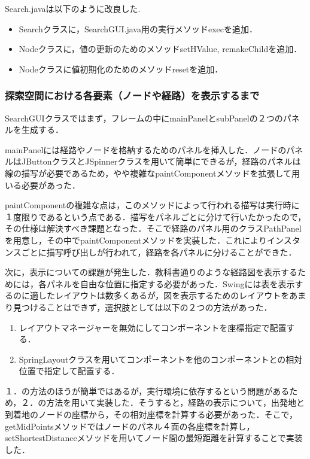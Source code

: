 \documentclass[12pt]{jarticle}
\begin{document}
Search.javaは以下のように改良した.
\begin{itemize}
\item Searchクラスに，SearchGUI.java用の実行メソッドexecを追加．
\item Nodeクラスに，値の更新のためのメソッドsetHValue, remakeChildを追加．
\item Nodeクラスに値初期化のためのメソッドresetを追加．
\end{itemize}

\subsubsection{探索空間における各要素（ノードや経路）を表示するまで}
SearchGUIクラスではまず，フレームの中にmainPanelとsubPanelの２つのパネルを生成する．

mainPanelには経路やノードを格納するためのパネルを挿入した．ノードのパネルはJButtonクラスとJSpinnerクラスを用いて簡単にできるが，経路のパネルは線の描写が必要であるため，やや複雑なpaintComponentメソッドを拡張して用いる必要があった．

paintComponentの複雑な点は，このメソッドによって行われる描写は実行時に１度限りであるという点である．描写をパネルごとに分けて行いたかったので，その仕様は解決すべき課題となった．そこで経路のパネル用のクラスPathPanelを用意し，その中でpaintComponentメソッドを実装した．これによりインスタンスごとに描写呼び出しが行われて，経路を各パネルに分けることができた．

次に，表示についての課題が発生した．教科書通りのような経路図を表示するためには，各パネルを自由な位置に指定する必要があった．Swingには表を表示するのに適したレイアウトは数多くあるが，図を表示するためのレイアウトをあまり見つけることはできず，選択肢としては以下の２つの方法があった．
\begin{enumerate}
\item レイアウトマネージャーを無効にしてコンポーネントを座標指定で配置する．
\item SpringLayoutクラスを用いてコンポーネントを他のコンポーネントとの相対位置で指定して配置する．
\end{enumerate}

１．の方法のほうが簡単ではあるが，実行環境に依存するという問題があるため，２．の方法を用いて実装した．そうすると，経路の表示について，出発地と到着地のノードの座標から，その相対座標を計算する必要があった．そこで，getMidPointsメソッドではノードのパネル４面の各座標を計算し，setShortestDistanceメソッドを用いてノード間の最短距離を計算することで実装した．
\end{document}
